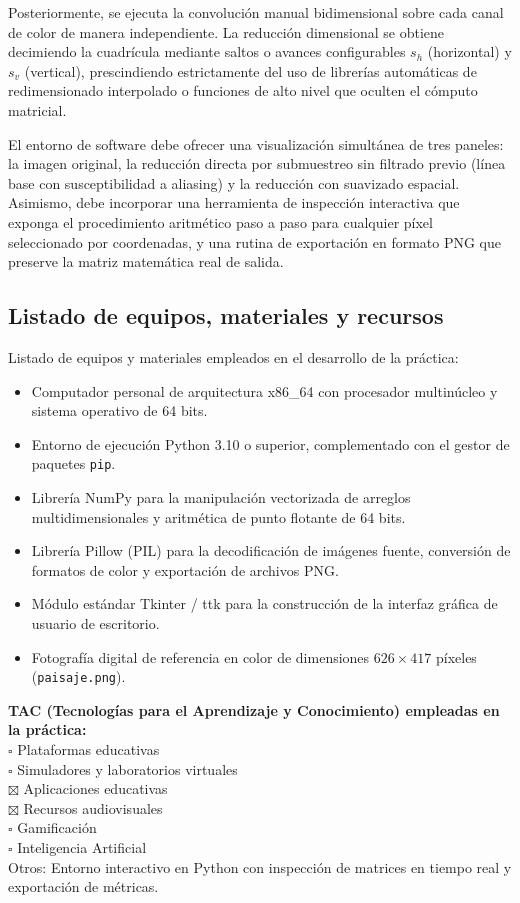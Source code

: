\documentclass[11pt]{article}
\begin{document}
Posteriormente, se ejecuta la convolución manual bidimensional sobre cada canal de color de manera independiente. La reducción dimensional se obtiene decimiendo la cuadrícula mediante saltos o avances configurables $s_h$ (horizontal) y $s_v$ (vertical), prescindiendo estrictamente del uso de librerías automáticas de redimensionado interpolado o funciones de alto nivel que oculten el cómputo matricial.

El entorno de software debe ofrecer una visualización simultánea de tres paneles: la imagen original, la reducción directa por submuestreo sin filtrado previo (línea base con susceptibilidad a aliasing) y la reducción con suavizado espacial. Asimismo, debe incorporar una herramienta de inspección interactiva que exponga el procedimiento aritmético paso a paso para cualquier píxel seleccionado por coordenadas, y una rutina de exportación en formato PNG que preserve la matriz matemática real de salida.

\subsection{Listado de equipos, materiales y recursos}
Listado de equipos y materiales empleados en el desarrollo de la práctica:
\begin{itemize}[itemsep=0.2em]
\item Computador personal de arquitectura x86\_64 con procesador multinúcleo y sistema operativo de 64 bits.
\item Entorno de ejecución Python 3.10 o superior, complementado con el gestor de paquetes \texttt{pip}.
\item Librería NumPy para la manipulación vectorizada de arreglos multidimensionales y aritmética de punto flotante de 64 bits.
\item Librería Pillow (PIL) para la decodificación de imágenes fuente, conversión de formatos de color y exportación de archivos PNG.
\item Módulo estándar Tkinter / ttk para la construcción de la interfaz gráfica de usuario de escritorio.
\item Fotografía digital de referencia en color de dimensiones $626\times417$ píxeles (\texttt{paisaje.png}).
\end{itemize}

\textbf{TAC (Tecnologías para el Aprendizaje y Conocimiento) empleadas en la práctica:}\\
$\square$ Plataformas educativas \\
$\square$ Simuladores y laboratorios virtuales \\
$\boxtimes$ Aplicaciones educativas \\
$\boxtimes$ Recursos audiovisuales \\
$\square$ Gamificación \\
$\square$ Inteligencia Artificial \\
Otros: Entorno interactivo en Python con inspección de matrices en tiempo real y exportación de métricas.
\end{document}
